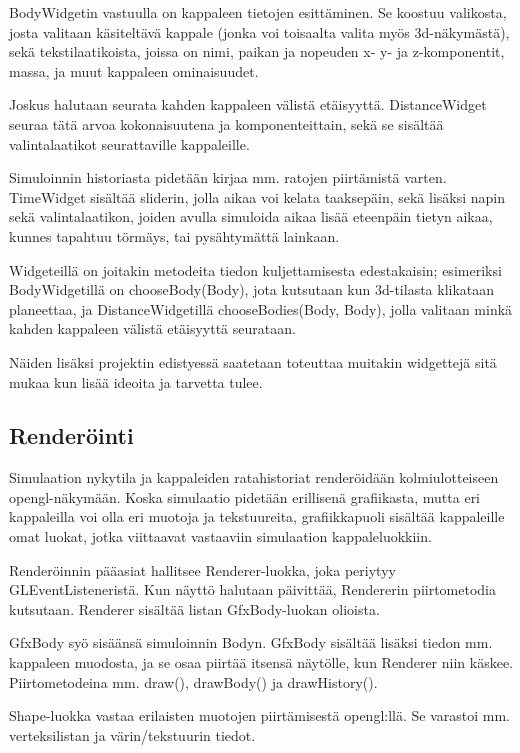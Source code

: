 \documentclass[a4paper,11pt]{article}
\begin{document}
BodyWidgetin vastuulla on kappaleen tietojen esittäminen. Se koostuu valikosta, josta valitaan käsiteltävä kappale (jonka voi toisaalta valita myös 3d-näkymästä), sekä tekstilaatikoista, joissa on nimi, paikan ja nopeuden x- y- ja z-komponentit, massa, ja muut kappaleen ominaisuudet.

Joskus halutaan seurata kahden kappaleen välistä etäisyyttä. DistanceWidget seuraa tätä arvoa kokonaisuutena ja komponenteittain, sekä se sisältää valintalaatikot seurattaville kappaleille.

Simuloinnin historiasta pidetään kirjaa mm. ratojen piirtämistä varten. TimeWidget sisältää sliderin, jolla aikaa voi kelata taaksepäin, sekä lisäksi napin sekä valintalaatikon, joiden avulla simuloida aikaa lisää eteenpäin tietyn aikaa, kunnes tapahtuu törmäys, tai pysähtymättä lainkaan.

Widgeteillä on joitakin metodeita tiedon kuljettamisesta edestakaisin; esimeriksi BodyWidgetillä on chooseBody(Body), jota kutsutaan kun 3d-tilasta klikataan planeettaa, ja DistanceWidgetillä chooseBodies(Body, Body), jolla valitaan minkä kahden kappaleen välistä etäisyyttä seurataan.

Näiden lisäksi projektin edistyessä saatetaan toteuttaa muitakin widgettejä sitä mukaa kun lisää ideoita ja tarvetta tulee.


\subsection{Renderöinti}

Simulaation nykytila ja kappaleiden ratahistoriat renderöidään kolmiulotteiseen opengl-näkymään. Koska simulaatio pidetään erillisenä grafiikasta, mutta eri kappaleilla voi olla eri muotoja ja tekstuureita, grafiikkapuoli sisältää kappaleille omat luokat, jotka viittaavat vastaaviin simulaation kappaleluokkiin.

Renderöinnin pääasiat hallitsee Renderer-luokka, joka periytyy GLEventListeneristä. Kun näyttö halutaan päivittää, Rendererin piirtometodia kutsutaan. Renderer sisältää listan GfxBody-luokan olioista.

GfxBody syö sisäänsä simuloinnin Bodyn. GfxBody sisältää lisäksi tiedon mm. kappaleen muodosta, ja se osaa piirtää itsensä näytölle, kun Renderer niin käskee. Piirtometodeina mm. draw(), drawBody() ja drawHistory().

Shape-luokka vastaa erilaisten muotojen piirtämisestä opengl:llä. Se varastoi mm. verteksilistan ja värin/tekstuurin tiedot.
\end{document}
